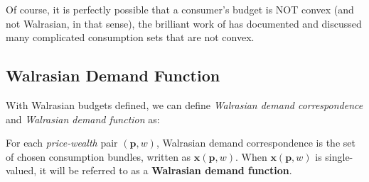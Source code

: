 Of course, it is perfectly possible that a consumer's budget is NOT convex (and not Walrasian, in that sense), the brilliant work of \citet{deaton1980economics} has documented and discussed many complicated consumption sets that are not convex.

\subsection{Walrasian Demand Function}
With Walrasian budgets defined, we can define \textit{Walrasian demand correspondence} and \textit{Walrasian demand function} as:
\begin{definition}
    For each \textit{price-wealth} pair $(\mathbf{p},w)$, Walrasian demand correspondence is the set of chosen consumption bundles, written as $\mathbf{x}(\mathbf{p},w)$. When $\mathbf{x}(\mathbf{p},w)$ is single-valued, it will be referred to as a \textbf{Walrasian demand function}.
\end{definition}

